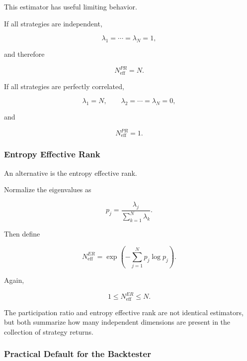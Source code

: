 \documentclass[11pt,a4paper]{article}
\begin{document}
This estimator has useful limiting behavior.

If all strategies are independent,

\begin{equation}
\lambda_1=\cdots=\lambda_N=1,
\end{equation}

and therefore

\begin{equation}
N_{\mathrm{eff}}^{PR}
=
N.
\end{equation}

If all strategies are perfectly correlated,

\begin{equation}
\lambda_1=N,
\qquad
\lambda_2=\cdots=\lambda_N=0,
\end{equation}

and

\begin{equation}
N_{\mathrm{eff}}^{PR}
=
1.
\end{equation}


\subsubsection{Entropy Effective Rank}

An alternative is the entropy effective rank.

Normalize the eigenvalues as

\begin{equation}
p_j
=
\frac{
\lambda_j
}{
\sum_{k=1}^{N}\lambda_k
}.
\end{equation}

Then define

\begin{equation}
\boxed{
N_{\mathrm{eff}}^{ER}
=
\exp
\left(
-
\sum_{j=1}^{N}
p_j\log p_j
\right).
}
\end{equation}

Again,

\begin{equation}
1
\leq
N_{\mathrm{eff}}^{ER}
\leq
N.
\end{equation}

The participation ratio and entropy effective rank are not identical estimators,
but both summarize how many independent dimensions are present in the collection
of strategy returns.


\subsubsection{Practical Default for the Backtester}
\end{document}
